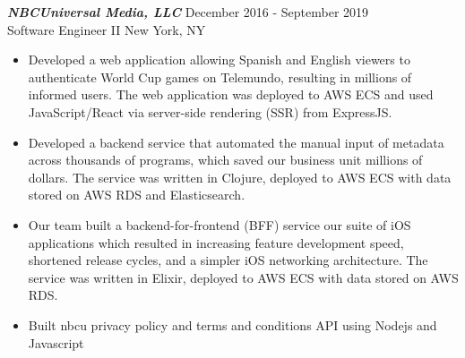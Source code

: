 {\sl \textbf{NBCUniversal Media, LLC}} \hfill December 2016 - September 2019 \\ Software Engineer II \hfill New York, NY
\begin{itemize}
    \item Developed a web application allowing Spanish and English viewers to authenticate World Cup games on Telemundo, resulting in millions of informed users. The web application was deployed to AWS ECS and used JavaScript/React via server-side rendering (SSR) from ExpressJS.
    \item Developed a backend service that automated the manual input of metadata across thousands of programs, which saved our business unit millions of dollars. The service was written in Clojure, deployed to AWS ECS with data stored on AWS RDS and Elasticsearch.
    \item Our team built a backend-for-frontend (BFF) service our suite of iOS applications which resulted in increasing feature development speed, shortened release cycles, and a simpler iOS networking architecture. The service was written in Elixir, deployed to AWS ECS with data stored on AWS RDS.
    \item Built nbcu privacy policy and terms and conditions API using Nodejs and Javascript
\end{itemize}
